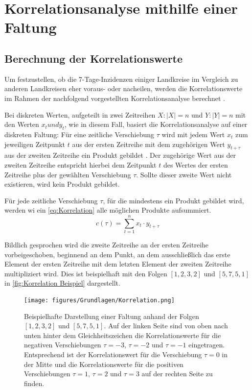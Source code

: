 \section{Korrelationsanalyse mithilfe einer Faltung}\label{sec:BeschreibungKorrelationsanalyse}
\subsection{Berechnung der Korrelationswerte}\label{sec:Grundlagen:BerechnungderKorrelationwertes}
Um festzustellen, ob die 7-Tage-Inzidenzen einiger Landkreise im Vergleich zu anderen Landkreisen eher voraus- oder nacheilen, werden die Korrelationswerte im Rahmen der nachfolgend vorgestellten Korrelationsanalyse berechnet \autocite{Korrelation}.

Bei diskreten Werten, aufgeteilt in zwei Zeitreihen $X:|X|=n$ und $Y:|Y|=n$ mit den Werten $x_t und y_t$, wie in diesem Fall, basiert die Korrelationsanalyse auf einer diskreten Faltung:
Für eine zeitliche Verschiebung $\tau$ wird mit jedem Wert $x_t$ zum jeweiligen Zeitpunkt $t$ aus der ersten Zeitreihe mit dem zugehörigen Wert $y_{t+\tau}$ aus der zweiten Zeitreihe ein Produkt gebildet . Der zugehörige Wert aus der zweiten Zeitreihe entspricht hierbei dem Zeitpunkt $t$ des Wertes der ersten Zeitreihe plus der gewählten Verschiebung $\tau$. Sollte dieser zweite Wert nicht existieren, wird kein Produkt gebildet.

Für jede zeitliche Verschiebung $\tau$, für die mindestens ein Produkt gebildet wird, werden wi ein \autoref{eq:Korrelation} alle möglichen Produkte aufsummiert.
\begin{equation}\label{eq:Korrelation}
    c(\tau) = \sum_{t=1}^n x_t\cdot y_{t+\tau}
\end{equation}


Bildlich gesprochen wird die zweite Zeitreihe an der ersten Zeitreihe vorbeigeschoben, beginnend an dem Punkt, an dem ausschließlich das erste Element der ersten Zeitreihe mit dem letzten Element der zweiten Zeitreihe multipliziert wird. Dies ist beispielhaft mit den Folgen $[1,2,3,2]$ und $[5,7,5,1]$ in \autoref{fig:Korrelation Beispiel} dargestellt.

\begin{figure}[H]
    \centering
    \texttt{[image: figures/Grundlagen/Korrelation.png]}
    \caption{Beispielhafte Darstellung einer Faltung anhand der Folgen $[1,2,3,2]$ und $[5,7,5,1]$. Auf der linken Seite sind von oben nach unten hinter dem Gleichheitszeichen die Korrelationswerte für die negativen Verschiebungen $\tau=-3$, $\tau=-2$ und $\tau=-1$ eingetragen. Entsprechend ist der Korrelationswert für die Verschiebung $\tau=0$ in der Mitte und die Korrelationswerte für die positiven Verschiebungen $\tau=1$, $\tau=2$ und $\tau=3$ auf der rechten Seite zu finden.}
    \label{fig:Korrelation Beispiel}
\end{figure}


